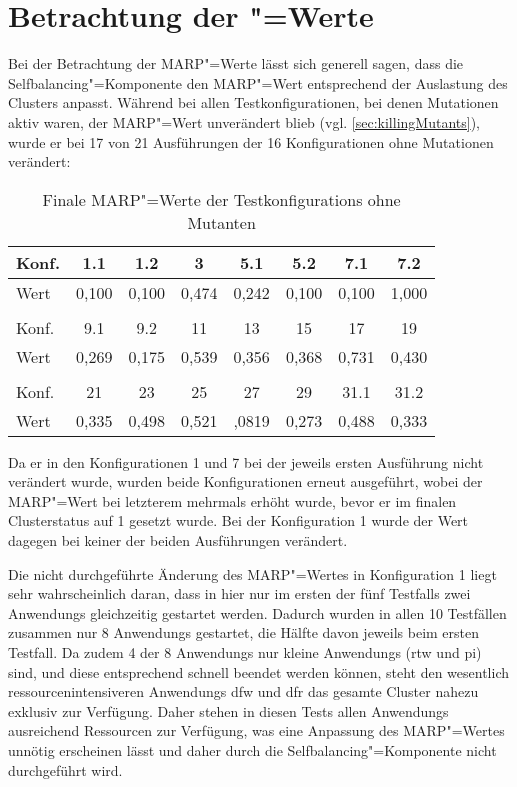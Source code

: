 \section{Betrachtung der "=Werte}
\label{sec:marpValueResults}

Bei der Betrachtung der \gls{MARP}"=Werte lässt sich generell sagen, dass die Selfbalancing"=Komponente den \gls{MARP}"=Wert entsprechend der Auslastung des Clusters anpasst.
Während bei allen Testkonfigurationen, bei denen Mutationen aktiv waren, der \gls{MARP}"=Wert unverändert blieb (vgl. \cref{sec:killingMutants}), wurde er bei 17 von 21 Ausführungen der 16 Konfigurationen ohne Mutationen verändert:

\begin{table}[h]
    \begin{tabular}{l|c|c|c|c|c|c|c}
    	Konf. &  1.1  &  1.2  &   3   &  5.1  &  5.2  &  7.1  &  7.2  \\ \hline
    	Wert  & 0,100 & 0,100 & 0,474 & 0,242 & 0,100 & 0,100 & 1,000 \\
    	\multicolumn{8}{c}{} \\
    	Konf. &  9.1  &  9.2  &  11   &  13   &  15   &  17   &  19   \\ \hline
    	Wert  & 0,269 & 0,175 & 0,539 & 0,356 & 0,368 & 0,731 & 0,430 \\
    	\multicolumn{8}{c}{} \\
    	Konf. &  21   &  23   &  25   &  27   &  29   & 31.1  & 31.2  \\ \hline
    	Wert  & 0,335 & 0,498 & 0,521 & ,0819 & 0,273 & 0,488 & 0,333
    \end{tabular}
    \caption{Finale \acrshort{MARP}"=Werte der \glspl{Testkonfiguration} ohne Mutanten}
    \label{tab:finalMarpValues}
\end{table}

Da er in den Konfigurationen 1 und 7 bei der jeweils ersten Ausführung nicht verändert wurde, wurden beide Konfigurationen erneut ausgeführt, wobei der \gls{MARP}"=Wert bei letzterem mehrmals erhöht wurde, bevor er im finalen Clusterstatus auf 1 gesetzt wurde.
Bei der Konfiguration 1 wurde der Wert dagegen bei keiner der beiden Ausführungen verändert.

Die nicht durchgeführte Änderung des \gls{MARP}"=Wertes in Konfiguration 1 liegt sehr wahrscheinlich daran, dass in hier nur im ersten der fünf \glspl{Testfall} zwei \glspl{Anwendung} gleichzeitig gestartet werden.
Dadurch wurden in allen 10 Testfällen zusammen nur 8 \glspl{Anwendung} gestartet, die Hälfte davon jeweils beim ersten Testfall.
Da zudem 4 der 8 \glspl{Anwendung} nur kleine \glspl{Anwendung} (\acrlong{rtw} und \acrlong{pi}) sind, und diese entsprechend schnell beendet werden können, steht den wesentlich ressourcenintensiveren \glspl{Anwendung} \acrlong{dfw} und \acrlong{dfr} das gesamte Cluster nahezu exklusiv zur Verfügung.
Daher stehen in diesen \glspl{Test} allen \glspl{Anwendung} ausreichend Ressourcen zur Verfügung, was eine Anpassung des \gls{MARP}"=Wertes unnötig erscheinen lässt und daher durch die Selfbalancing"=Komponente nicht durchgeführt wird.


